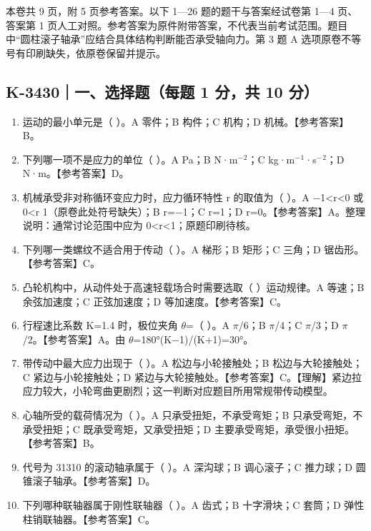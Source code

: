 \documentclass[zihao=5,a4paper,UTF8,fontset=fandol]{ctexart}
\begin{document}
本卷共 9 页，附 5 页参考答案。以下 1—26 题的题干与答案经试卷第 1—4 页、答案第 1 页人工对照。参考答案为原件附带答案，不代表当前考试范围。题目中“圆柱滚子轴承”应结合具体结构判断能否承受轴向力。第 3 题 A 选项原卷不等号有印刷缺失，依原卷保留并提示。





\subsection{K-3430｜一、选择题（每题 1 分，共 10 分）}
\label{k-3430}

\begin{enumerate}
\item 
运动的最小单元是（ ）。A 零件；B 构件；C 机构；D 机械。【参考答案】B。


\item 
下列哪一项不是应力的单位（ ）。A Pa；B N·m$^{-}$$^{2}$；C kg·m$^{-}$$^{1}$·s$^{-}$$^{2}$；D N·m。【参考答案】D。


\item 
机械承受非对称循环变应力时，应力循环特性 r 的取值为（ ）。A $-$1<r<0 或 0<r 1（原卷此处符号缺失）；B r=$-$1；C r=1；D r=0。【参考答案】A。整理说明：通常讨论范围中应为 0<r<1；原题印刷待核。


\item 
下列哪一类螺纹不适合用于传动（ ）。A 梯形；B 矩形；C 三角；D 锯齿形。【参考答案】C。


\item 
凸轮机构中，从动件处于高速轻载场合时需要选取（ ）运动规律。A 等速；B 余弦加速度；C 正弦加速度；D 等加速度。【参考答案】C。


\item 
行程速比系数 K=1.4 时，极位夹角 $\theta$=（ ）。A $\pi$/6；B $\pi$/4；C $\pi$/3；D $\pi$/2。【参考答案】A。由 $\theta$=180°(K$-$1)/(K+1)=30°。


\item 
带传动中最大应力出现于（ ）。A 松边与小轮接触处；B 松边与大轮接触处；C 紧边与小轮接触处；D 紧边与大轮接触处。【参考答案】C。【理解】紧边拉应力较大，小轮弯曲更剧烈；这一判断对应题目所用常规带传动模型。


\item 
心轴所受的载荷情况为（ ）。A 只承受扭矩，不承受弯矩；B 只承受弯矩，不承受扭矩；C 既承受弯矩，又承受扭矩；D 主要承受弯矩，承受很小扭矩。【参考答案】B。


\item 
代号为 31310 的滚动轴承属于（ ）。A 深沟球；B 调心滚子；C 推力球；D 圆锥滚子轴承。【参考答案】D。


\item 
下列哪种联轴器属于刚性联轴器（ ）。A 齿式；B 十字滑块；C 套筒；D 弹性柱销联轴器。【参考答案】C。



\end{enumerate}
\end{document}
